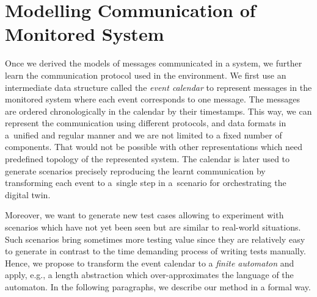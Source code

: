 {%

\section{Modelling Communication of Monitored System}
\label{sec:model}

Once we derived the models of messages communicated in a system, we further
learn the communication protocol used in the environment.
%
We first use an intermediate data structure called the \emph{event calendar} to
represent messages in the monitored system where each event corresponds to one
message.
%
The messages are ordered chronologically in the calendar by their timestamps.
%
This way, we can represent the communication using different protocols, and data
formats in a~unified and regular manner and we are not limited to a
fixed number of components.
That would not be possible with other representations which need predefined
topology of the represented system.
%
The calendar is later used to generate scenarios precisely reproducing the learnt
communication by transforming each event to a~single step in a~scenario for
orchestrating the digital twin.
%

Moreover, we want to generate new test cases allowing to experiment with
scenarios which have not yet been seen but are similar to real-world
situations.
%
Such scenarios bring sometimes more testing value since they are relatively
easy to generate in contrast to the time demanding process of writing
tests manually.
%
Hence, we propose to transform the event calendar to a \emph{finite
automaton} and apply, e.g., a length abstraction which over-approximates the language
of the automaton.
In the following paragraphs, we describe our method in a formal way.

}
